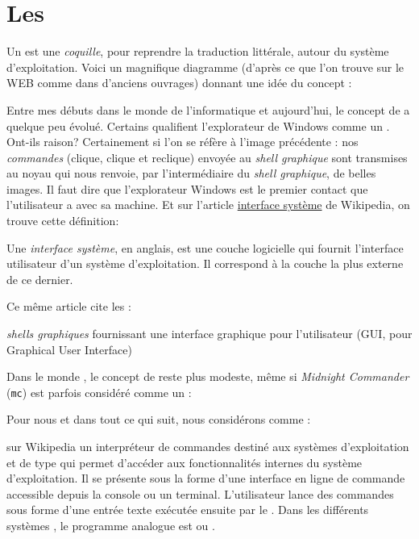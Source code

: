 
\section{Les \shells{}}
Un \shell{} est une \emph{coquille}, pour reprendre la traduction littérale, autour du système d'exploitation. Voici un magnifique diagramme (d'après ce que l'on trouve sur le WEB comme dans d'anciens ouvrages) donnant une idée du concept :


Entre mes débuts dans le monde de l'informatique et aujourd'hui, le concept de  \shell{} a quelque peu évolué. Certains qualifient l'explorateur de Windows comme un  \shell{}. Ont-ils raison? Certainement si l'on se réfère à l'image précédente : nos \emph{commandes} (clique, clique et reclique) envoyée au \emph{shell graphique} sont transmises au noyau qui nous renvoie, par l'intermédiaire du \emph{shell graphique}, de belles images. Il faut dire que l'explorateur Windows est le premier contact que l'utilisateur a avec sa machine.  Et sur l'article
\href{http://fr.wikipedia.org/wiki/Interface_syst%C3%A8me}{interface système} de Wikipedia, on trouve cette définition:

\begin{Quote}
Une \emph{interface système}, \shell{} en anglais, est une couche logicielle qui fournit l'interface utilisateur d'un système d'exploitation. Il correspond à la couche la plus externe de ce dernier.
\end{Quote}

Ce même article cite les :

\begin{Quote}
\emph{shells graphiques} fournissant une interface graphique pour l'utilisateur (GUI, pour Graphical User Interface)
\end{Quote}

Dans le monde \unix{}, le concept de  \shell{} reste plus modeste, même si \emph{Midnight Commander} (\texttt{mc}) est parfois considéré comme un \shell{}:


Pour nous et dans tout ce qui suit, nous considérons comme  \shell{} :

\begin{Quotebis}{%
\href{http://fr.wikipedia.org/wiki/Shell_Unix}{\shell{} \unix{}} sur Wikipedia}
un interpréteur de commandes destiné aux systèmes d'exploitation \unix{} et de type \unix{} qui permet d'accéder aux fonctionnalités internes du système d'exploitation. Il se présente sous la forme d'une interface en ligne de commande accessible depuis la console ou un terminal. L'utilisateur lance des commandes sous forme d'une entrée texte exécutée ensuite par le  \shell{}. Dans les différents systèmes \windows, le programme analogue est  ou .
\end{Quotebis}

